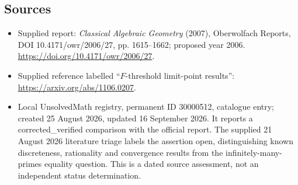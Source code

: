 \documentclass[11pt]{article}
\begin{document}
\subsection{Sources}
\begin{itemize}
\item Supplied report: \emph{Classical Algebraic Geometry} (2007), Oberwolfach Reports, DOI 10.4171/owr/2006/27, pp. 1615--1662; proposed year 2006. \url{https://doi.org/10.4171/owr/2006/27}.
\item Supplied reference labelled ``$F$-threshold limit-point results'': \url{https://arxiv.org/abs/1106.0207}.
\item Local UnsolvedMath registry, permanent ID 30000512, catalogue entry; created 25 August 2026, updated 16 September 2026. It reports a corrected\_verified comparison with the official report. The supplied 21 August 2026 literature triage labels the assertion open, distinguishing known discreteness, rationality and convergence results from the infinitely-many-primes equality question. This is a dated source assessment, not an independent status determination.
\end{itemize}
\end{document}
